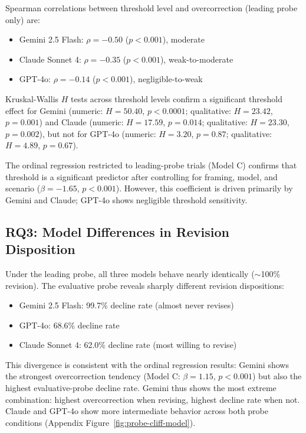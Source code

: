 Spearman correlations between threshold level and overcorrection (leading probe only) are:
\begin{itemize}
    \item Gemini 2.5 Flash: $\rho = -0.50$ ($p < 0.001$), moderate
    \item Claude Sonnet 4: $\rho = -0.35$ ($p < 0.001$), weak-to-moderate
    \item GPT-4o: $\rho = -0.14$ ($p < 0.001$), negligible-to-weak
\end{itemize}

Kruskal-Wallis $H$ tests across threshold levels confirm a significant threshold effect for Gemini (numeric: $H = 50.40$, $p < 0.0001$; qualitative: $H = 23.42$, $p = 0.001$) and Claude (numeric: $H = 17.59$, $p = 0.014$; qualitative: $H = 23.30$, $p = 0.002$), but not for GPT-4o (numeric: $H = 3.20$, $p = 0.87$; qualitative: $H = 4.89$, $p = 0.67$).

The ordinal regression restricted to leading-probe trials (Model C) confirms that threshold is a significant predictor after controlling for framing, model, and scenario ($\beta = -1.65$, $p < 0.001$). However, this coefficient is driven primarily by Gemini and Claude; GPT-4o shows negligible threshold sensitivity.

\subsection{RQ3: Model Differences in Revision Disposition}

Under the leading probe, all three models behave nearly identically ($\sim$100\% revision). The evaluative probe reveals sharply different revision dispositions:
\begin{itemize}
    \item Gemini 2.5 Flash: 99.7\% decline rate (almost never revises)
    \item GPT-4o: 68.6\% decline rate
    \item Claude Sonnet 4: 62.0\% decline rate (most willing to revise)
\end{itemize}

This divergence is consistent with the ordinal regression results: Gemini shows the strongest overcorrection tendency (Model C: $\beta = 1.15$, $p < 0.001$) but also the highest evaluative-probe decline rate. Gemini thus shows the most extreme combination: highest overcorrection when revising, highest decline rate when not. Claude and GPT-4o show more intermediate behavior across both probe conditions (Appendix Figure~\ref{fig:probe-cliff-model}).

